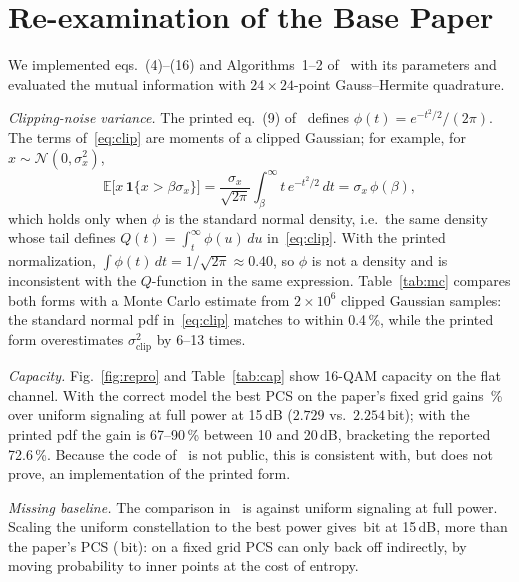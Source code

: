 \documentclass[conference]{IEEEtran}
\begin{document}
\section{Re-examination of the Base Paper}\label{sec:repro}
We implemented eqs.~(4)--(16) and Algorithms~1--2 of~\cite{pham2026} with its parameters and evaluated the mutual information with $24\times24$-point Gauss--Hermite quadrature.

\textit{Clipping-noise variance.} The printed eq.~(9) of~\cite{pham2026} defines $\phi(t)=e^{-t^2/2}/(2\pi)$. The terms of~\eqref{eq:clip} are moments of a clipped Gaussian; for example, for $x\sim\mathcal N(0,\sigma_x^2)$,
\begin{equation}
\mathbb{E}\big[x\,\mathbf 1\{x>\beta\sigma_x\}\big]=\frac{\sigma_x}{\sqrt{2\pi}}\int_\beta^\infty t\,e^{-t^2/2}\,dt=\sigma_x\,\phi(\beta),
\end{equation}
which holds only when $\phi$ is the standard normal density, i.e.\ the same density whose tail defines $Q(t)=\int_t^\infty\phi(u)\,du$ in~\eqref{eq:clip}. With the printed normalization, $\int\phi(t)\,dt=1/\sqrt{2\pi}\approx0.40$, so $\phi$ is not a density and is inconsistent with the $Q$-function in the same expression. Table~\ref{tab:mc} compares both forms with a Monte Carlo estimate from $2\times10^6$ clipped Gaussian samples: the standard normal pdf in~\eqref{eq:clip} matches to within 0.4\,\%, while the printed form overestimates $\sigma^2_{\mathrm{clip}}$ by 6--13 times.



\textit{Capacity.} Fig.~\ref{fig:repro} and Table~\ref{tab:cap} show 16-QAM capacity on the flat channel. With the correct model the best PCS on the paper's fixed grid gains \PCSgainCorrect\,\% over uniform signaling at full power at 15\,dB ($2.729$ vs.\ $2.254$\,bit); with the printed pdf the gain is 67--90\,\% between 10 and 20\,dB, bracketing the reported 72.6\,\%. Because the code of~\cite{pham2026} is not public, this is consistent with, but does not prove, an implementation of the printed form.

\textit{Missing baseline.} The comparison in~\cite{pham2026} is against uniform signaling at full power. Scaling the uniform constellation to the best power gives \BackoffCap\,bit at 15\,dB, more than the paper's PCS (\PCSCap\,bit): on a fixed grid PCS can only back off indirectly, by moving probability to inner points at the cost of entropy.
\end{document}
